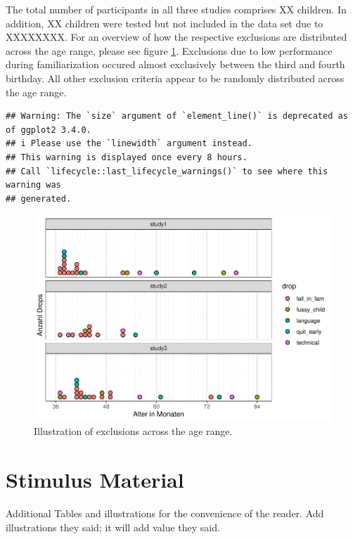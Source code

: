 \documentclass[
  man]{apa6}
\begin{document}
The total number of participants in all three studies comprises XX children. In addition, XX children were tested but not included in the data set due to XXXXXXXX. For an overview of how the respective exclusions are distributed across the age range, please see figure \ref{fig:suppl-drops-dots}. Exclusions due to low performance during familiarization occured almost exclusively between the third and fourth birthday. All other exclusion criteria appear to be randomly distributed across the age range.

\begin{verbatim}
## Warning: The `size` argument of `element_line()` is deprecated as of ggplot2 3.4.0.
## i Please use the `linewidth` argument instead.
## This warning is displayed once every 8 hours.
## Call `lifecycle::last_lifecycle_warnings()` to see where this warning was
## generated.
\end{verbatim}

\begin{figure}

{\centering \includegraphics{symlit_rep_manuscript_files/figure-latex/suppl-drops-dots-1} 

}

\caption{Illustration of exclusions across the age range.}\label{fig:suppl-drops-dots}
\end{figure}

\section{Stimulus Material}\label{stimulus-material}

Additional Tables and illustrations for the convenience of the reader. Add illustrations they said; it will add value they said.
\end{document}
